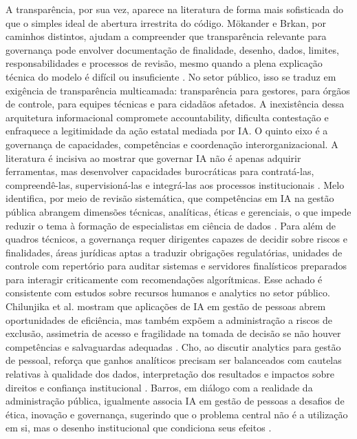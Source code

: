 \documentclass[12pt,a4paper]{article}
\begin{document}
A transparência, por sua vez, aparece na literatura de forma mais sofisticada do que o simples ideal de abertura irrestrita do código. Mökander e Brkan, por caminhos distintos, ajudam a compreender que transparência relevante para governança pode envolver documentação de finalidade, desenho, dados, limites, responsabilidades e processos de revisão, mesmo quando a plena explicação técnica do modelo é difícil ou insuficiente \autocite{mkander2023auditing} \autocite{brkan2020legal}. No setor público, isso se traduz em exigência de transparência multicamada: transparência para gestores, para órgãos de controle, para equipes técnicas e para cidadãos afetados. A inexistência dessa arquitetura informacional compromete accountability, dificulta contestação e enfraquece a legitimidade da ação estatal mediada por IA.
O quinto eixo é a governança de capacidades, competências e coordenação interorganizacional. A literatura é incisiva ao mostrar que governar IA não é apenas adquirir ferramentas, mas desenvolver capacidades burocráticas para contratá-las, compreendê-las, supervisioná-las e integrá-las aos processos institucionais \autocite{melo2026competencias} \autocite{madan2022ai}. Melo identifica, por meio de revisão sistemática, que competências em IA na gestão pública abrangem dimensões técnicas, analíticas, éticas e gerenciais, o que impede reduzir o tema à formação de especialistas em ciência de dados \autocite{melo2026competencias}. Para além de quadros técnicos, a governança requer dirigentes capazes de decidir sobre riscos e finalidades, áreas jurídicas aptas a traduzir obrigações regulatórias, unidades de controle com repertório para auditar sistemas e servidores finalísticos preparados para interagir criticamente com recomendações algorítmicas.
Esse achado é consistente com estudos sobre recursos humanos e analytics no setor público. Chilunjika et al. mostram que aplicações de IA em gestão de pessoas abrem oportunidades de eficiência, mas também expõem a administração a riscos de exclusão, assimetria de acesso e fragilidade na tomada de decisão se não houver competências e salvaguardas adequadas \autocite{chilunjika2022artificial}. Cho, ao discutir analytics para gestão de pessoal, reforça que ganhos analíticos precisam ser balanceados com cautelas relativas à qualidade dos dados, interpretação dos resultados e impactos sobre direitos e confiança institucional \autocite{cho2023human}. Barros, em diálogo com a realidade da administração pública, igualmente associa IA em gestão de pessoas a desafios de ética, inovação e governança, sugerindo que o problema central não é a utilização em si, mas o desenho institucional que condiciona seus efeitos \autocite{barros2025inteligencia}.
\end{document}

